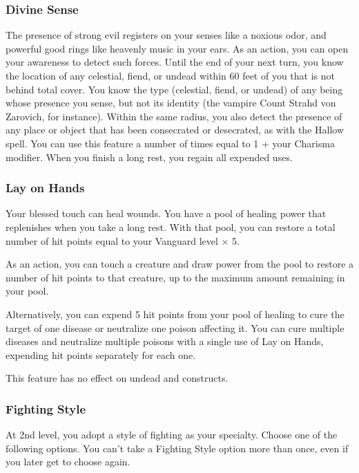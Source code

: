\subsubsection{Divine Sense}\label{vanguard-feature-divine-sense}

The presence of strong evil registers on your senses like a noxious
odor, and powerful good rings like heavenly music in your ears. As an
action, you can open your awareness to detect such forces. Until the end
of your next turn, you know the location of any celestial, fiend, or
undead within 60 feet of you that is not behind total cover. You know
the type (celestial, fiend, or undead) of any being whose presence you
sense, but not its identity (the vampire Count Strahd von Zarovich, for
instance). Within the same radius, you also detect the presence of any
place or object that has been consecrated or desecrated, as with the
Hallow spell. You can use this feature a number of times equal to 1 +
your Charisma modifier. When you finish a long rest, you regain all
expended uses.

\subsubsection{Lay on Hands}\label{vanguard-feature-lay-on-hands}

Your blessed touch can heal wounds. You have a pool of healing power
that replenishes when you take a long rest. With that pool, you can
restore a total number of hit points equal to your Vanguard level × 5.

As an action, you can touch a creature and draw power from the pool to
restore a number of hit points to that creature, up to the maximum
amount remaining in your pool.

Alternatively, you can expend 5 hit points from your pool of healing to
cure the target of one disease or neutralize one poison affecting it.
You can cure multiple diseases and neutralize multiple poisons with a
single use of Lay on Hands, expending hit points separately for each
one.

This feature has no effect on undead and constructs.

\subsubsection{Fighting Style}\label{vanguard-feature-fighting-style}

At 2nd level, you adopt a style of fighting as your specialty. Choose
one of the following options. You can't take a Fighting Style option
more than once, even if you later get to choose again.

